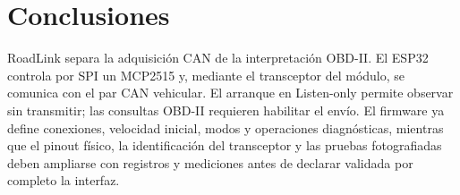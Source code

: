 \documentclass[11pt,letterpaper]{article}
\begin{document}
\section{Conclusiones}
RoadLink separa la adquisición CAN de la interpretación OBD-II. El ESP32
controla por SPI un MCP2515 y, mediante el transceptor del módulo, se
comunica con el par CAN vehicular. El arranque en Listen-only permite observar
sin transmitir; las consultas OBD-II requieren habilitar el envío. El firmware
ya define conexiones, velocidad inicial, modos y operaciones diagnósticas,
mientras que el pinout físico, la identificación del transceptor y las pruebas
fotografiadas deben ampliarse con registros y mediciones antes de declarar
validada por completo la interfaz.
\end{document}
